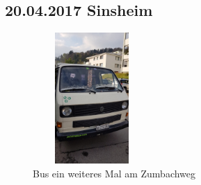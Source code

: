 \subsection{20.04.2017 Sinsheim }

\begin{figure} 
  \begin{centering}
    \includegraphics[width=0.4\textwidth, height=5cm, keepaspectratio]{../Bilder/Sinsheim/1.jpg}
    \caption{Bus ein weiteres Mal am Zumbachweg}
  \end{centering}
\end{figure} 


